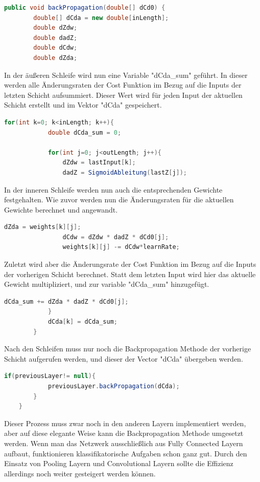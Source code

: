\documentclass[12pt]{article}
\begin{document}
\begin{lstlisting}[language=Java]
    public void backPropagation(double[] dCd0) {
        double[] dCda = new double[inLength];
        double dZdw;
        double dadZ;
        double dCdw;
        double dZda;
\end{lstlisting} 
In der äußeren Schleife wird nun eine Variable "dCda\_sum" geführt. In dieser werden alle Änderungsraten der Cost Funktion im Bezug auf die Inputs der letzten Schicht aufsummiert. Dieser Wert wird für jeden Input der aktuellen Schicht erstellt und im Vektor "dCda" gespeichert.
\begin{lstlisting}[language=Java]  
        for(int k=0; k<inLength; k++){
            double dCda_sum = 0;

            for(int j=0; j<outLength; j++){
                dZdw = lastInput[k];
                dadZ = SigmoidAbleitung(lastZ[j]);
\end{lstlisting} 
In der inneren Schleife werden nun auch die entsprechenden Gewichte festgehalten. Wie zuvor werden nun die Änderungsraten für die aktuellen Gewichte berechnet und angewandt.
\begin{lstlisting}[language=Java]  
                dZda = weights[k][j]; 
                dCdw = dZdw * dadZ * dCd0[j];
                weights[k][j] -= dCdw*learnRate;
\end{lstlisting} 
Zuletzt wird aber die Änderungsrate der Cost Funktion im Bezug auf die Inputs der vorherigen Schicht berechnet. Statt dem letzten Input wird hier das aktuelle Gewicht multipliziert, und zur variable "dCda\_sum" hinzugefügt.
\begin{lstlisting}[language=Java]              
                dCda_sum += dZda * dadZ * dCd0[j];
            }
            dCda[k] = dCda_sum;
        }
\end{lstlisting} 
Nach den Schleifen muss nur noch die Backpropagation Methode der vorherige Schicht aufgerufen werden, und dieser der Vector "dCda" übergeben werden.
\begin{lstlisting}[language=Java]   
        if(previousLayer!= null){
            previousLayer.backPropagation(dCda);
        }
    }
\end{lstlisting} 

Dieser Prozess muss zwar noch in den anderen Layern implementiert werden, aber auf diese elegante Weise kann die Backpropagation Methode umgesetzt werden. Wenn man das Netzwerk ausschließlich aus Fully Connected Layern aufbaut, funktionieren klassifikatorische Aufgaben schon ganz gut. Durch den Einsatz von Pooling Layern und Convolutional Layern sollte die Effizienz allerdings noch weiter gesteigert werden können.
\end{document}
